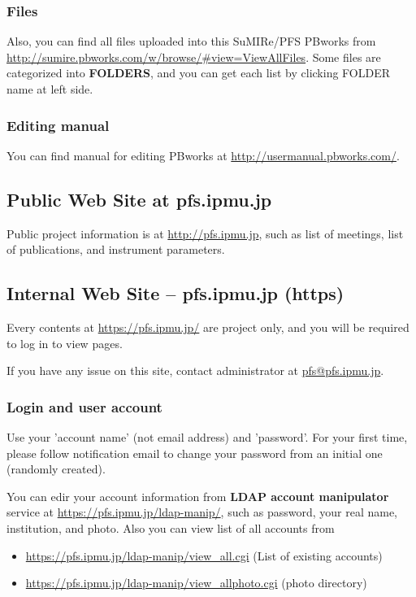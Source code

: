 \documentclass[a4paper,notitlepage]{article}
\begin{document}
\subsubsection{Files}

Also, you can find all files uploaded into this SuMIRe/PFS PBworks from 
\url{http://sumire.pbworks.com/w/browse/#view=ViewAllFiles}.
Some files are categorized into {\bf FOLDERS}, and you can get each list by 
clicking FOLDER name at left side. 

\subsubsection{Editing manual}

You can find manual for editing PBworks at 
\url{http://usermanual.pbworks.com/}. 


\subsection{Public Web Site at pfs.ipmu.jp}

Public project information is at \url{http://pfs.ipmu.jp}, 
such as list of meetings, list of publications, and instrument parameters. 

\subsection{Internal Web Site -- pfs.ipmu.jp (https)}

Every contents at \url{https://pfs.ipmu.jp/} are project only, and you will 
be required to log in to view pages. 

If you have any issue on this site, contact administrator 
at \url{pfs@pfs.ipmu.jp}. 

\subsubsection{Login and user account}

Use your 'account name' (not email address) and 'password'.
For your first time, please follow notification email to change your password 
from an initial one (randomly created). 

You can edir your account information from {\bf LDAP account manipulator} 
service at \url{https://pfs.ipmu.jp/ldap-manip/}, 
such as password, your real name, institution, and photo. 
Also you can view list of all accounts from 

\begin{itemize}
  \item \url{https://pfs.ipmu.jp/ldap-manip/view_all.cgi} (List of existing accounts)
  \item \url{https://pfs.ipmu.jp/ldap-manip/view_allphoto.cgi} (photo directory)
\end{itemize}
\end{document}
